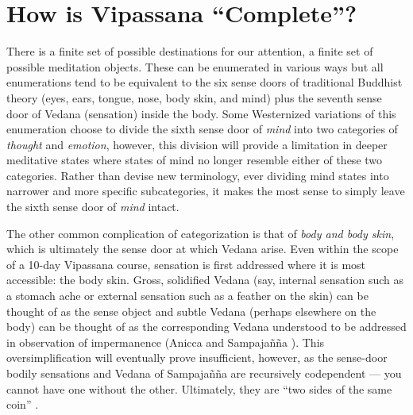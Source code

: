 \documentclass[a4paper, amsfonts, amssymb, amsmath, reprint, showkeys, nofootinbib, twoside]{revtex4-1}
\begin{document}
\section{How is Vipassana ``Complete''?}

There is a finite set of possible destinations for our attention, a finite set of
possible meditation objects. These can be
enumerated in various ways but all enumerations tend to be equivalent to the six
sense doors of traditional Buddhist theory (eyes, ears, tongue, nose, body skin, and mind) plus
the seventh sense door of Vedana
(sensation) inside the body. Some Westernized variations of this enumeration choose
to divide the sixth sense door of \textit{mind} into two categories of
\textit{thought} and \textit{emotion}, however, this division will provide a
limitation in deeper meditative states where states of mind no longer resemble either
of these two categories. Rather than devise new terminology, ever dividing mind
states into narrower and more specific subcategories, it makes the most sense to
simply leave the sixth sense door of \textit{mind} intact.


The other common
complication of categorization is that of \textit{body and body skin}, which is ultimately the sense
door at which Vedana arise. Even within the scope of a 10-day Vipassana course,
sensation is first addressed where it is most accessible: the body skin. Gross,
solidified Vedana (say, internal sensation such as
a stomach ache or external sensation such as a feather on the skin) can be thought of
as the sense object and subtle Vedana (perhaps elsewhere on the body) can be thought of as the corresponding Vedana
understood to be addressed in observation of impermanence (Anicca and Sampajañña
). This oversimplification will eventually prove insufficient, however,
as the sense-door bodily sensations and Vedana of Sampajañña are recursively
codependent --- you cannot have one without the other. Ultimately, they are ``two
sides of the same coin'' .

\end{document}
